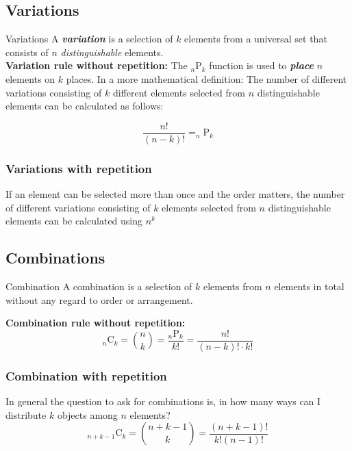 \subsection{Variations}
\begin{definition}[]{Variations}
    A \textbf{\textit{variation}} is a selection of $k$ elements from a universal set that consists of $n$ \textit{distinguishable} elements.\\

    \textbf{Variation rule without repetition:} The $_n\mbox{P}_k$ function is used to \textit{\textbf{place}} $n$ elements on $k$ places. In a more mathematical definition:
    The number of different variations consisting of $k$ different elements selected from $n$ distinguishable elements can be calculated as follows:

    \[
        \frac{n!}{(n - k)!} = _n\mbox{P}_k
    \]
\end{definition}

\subsubsection{Variations with repetition}
If an element can be selected more than once and the order matters, the number of different variations consisting of $k$ elements selected from $n$ distinguishable elements can be calculated using $n^k$



\subsection{Combinations}
\begin{definition}[]{Combination}
    A combination is a selection of $k$ elements from $n$ elements in total without any regard to order or arrangement.

    \textbf{Combination rule without repetition:} \[
        _n\mbox{C}_k = {n\choose k} = \frac{_n\mbox{P}_k}{k!} = \frac{n!}{(n - k)! \cdot k!}
    \]
\end{definition}

\subsubsection{Combination with repetition}
In general the question to ask for combinations is, in how many ways can I distribute $k$ objects among $n$ elements?
\[
    _{n + k - 1}\mbox{C}_k = {n + k - 1\choose k} = \frac{(n + k - 1)!}{k!(n - 1)!}
\]



